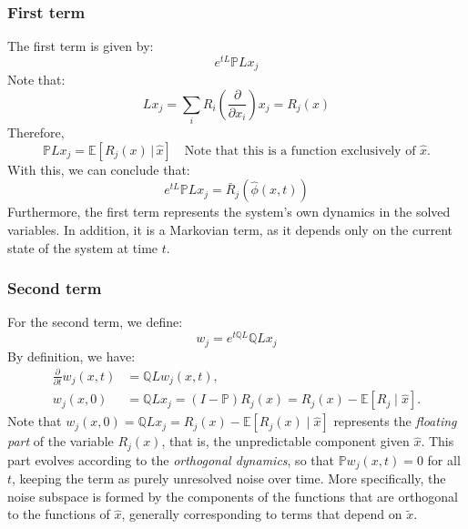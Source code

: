 \documentclass[12pt]{article}
\begin{document}
\subsubsection{First term}
The first term is given by:
\begin{equation}
    
e^{tL} \mathbb{P}L x_j
    \label{eq:first-term-mz}
\end{equation}
Note that:  
\begin{equation*}
    Lx_j = \sum_i R_i\left(\frac{\partial}{\partial x_i}\right)x_j = R_j(x)
\end{equation*}
Therefore,  
\begin{equation*}
    \mathbb{P}Lx_j = \mathbb{E}[R_j(x)\,|\,\hat{x}] \quad \text{Note that this is a function exclusively of $\hat{x}$.}
\end{equation*}
With this, we can conclude that:  
\begin{equation*}
    
e^{tL}\mathbb{P}Lx_j = \bar{R}_j\left(\hat{\phi}(x,t)\right)
\end{equation*}
Furthermore, the first term represents the system's own dynamics in the solved variables. In addition, it is a Markovian term, as it depends only on the current state of the system at time $t$.
\subsubsection{Second term}
For the second term, we define:
\begin{equation*}
w_j = e^{t\mathbb{Q}L} \mathbb{Q}L x_j
\end{equation*}
By definition, we have:
\begin{align}
\frac{\partial}{\partial t} w_j(x,t) & = \mathbb{Q}L w_j(x,t),\\
    
w_j(x,0)                             & = \mathbb{Q}L x_j = (I - \mathbb{P})R_j(x) = R_j(x) - \mathbb{E}[R_j \mid \hat{x}]. 
    \label{eq:mori-zwanzig-orthogonal-dynamics}
\end{align}
Note that $w_j(x,0) = \mathbb{Q}Lx_j = R_j(x) - \mathbb{E}[R_j(x) \mid \hat{x}]$ represents the \textit{floating part} of the variable $R_j(x)$, that is, the unpredictable component given $\hat{x}$. This part evolves according to the \textit{orthogonal dynamics}, so that $\mathbb{P} w_j(x,t) = 0$ for all $t$, keeping the term as purely unresolved noise over time.
More specifically, the noise subspace is formed by the components of the functions that are orthogonal to the functions of $\hat{x}$, generally corresponding to terms that depend on $\tilde{x}$.
 
\end{document}
